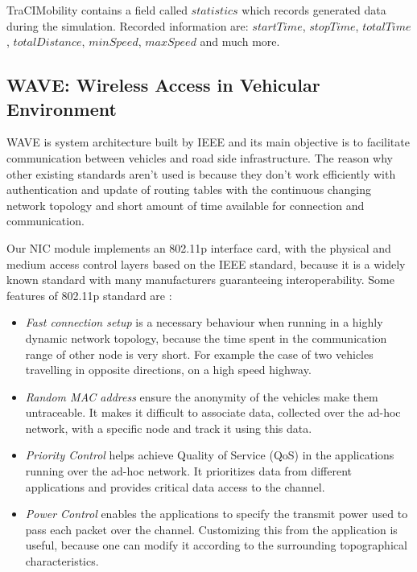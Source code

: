 TraCIMobility contains a field called $statistics$ which records generated data
during the simulation. Recorded information are: $startTime$, $stopTime$,
$totalTime$, $totalDistance$, $minSpeed$, $maxSpeed$ and much more.

\subsection{WAVE: Wireless Access in Vehicular Environment}

WAVE is system architecture built by IEEE and its main objective is to
facilitate communication between vehicles and road side infrastructure. The
reason why other existing standards aren't used is because they don't work
efficiently with authentication and update of routing tables with the continuous
changing network topology and short amount of time available for connection and
communication.

Our NIC module implements an 802.11p interface card, with the physical and
medium access control layers based on the IEEE standard, because it is a widely
known standard with many manufacturers guaranteeing interoperability. Some
features of 802.11p standard are \cite{phule2012public}:
 
\begin{itemize}
  \item {\it Fast connection setup} is a necessary behaviour when running in a
  highly dynamic network topology, because the time spent in the communication
  range of other node is very short. For example the case of two vehicles
  travelling in opposite directions, on a high speed highway.
  \item {\it Random MAC address} ensure the anonymity of the vehicles make them
  untraceable. It makes it difficult to associate data, collected over the
  ad-hoc network, with a specific node and track it using this data.
  \item {\it Priority Control} helps achieve Quality of Service (QoS) in the
  applications running over the ad-hoc network. It prioritizes data from
  different applications and provides critical data access to the channel.
  \item{\it Power Control} enables the applications to specify the transmit
  power used to pass each packet over the channel. Customizing this from the
  application is useful, because one can modify it according to the surrounding
  topographical characteristics.
\end{itemize}



